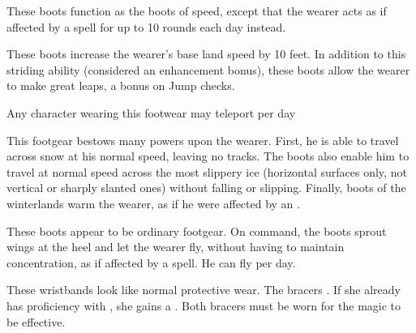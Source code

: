  These boots function as the boots of speed, except that the wearer acts as if affected by a  spell for up to 10 rounds each day instead.

 These boots increase the wearer's base land speed by 10 feet. In addition to this striding ability (considered an enhancement bonus), these boots allow the wearer to make great leaps,  a   bonus on Jump checks.

 Any character wearing this footwear may teleport  per day 

 This footgear bestows many powers upon the wearer. First, he is able to travel across snow at his normal speed, leaving no tracks. The boots also enable him to travel at normal speed across the most slippery ice (horizontal surfaces only, not vertical or sharply slanted ones) without falling or slipping. Finally, boots of the winterlands warm the wearer, as if he were affected by an  .

 These boots appear to be ordinary footgear. On command, the boots sprout wings at the heel and let the wearer fly, without having to maintain concentration, as if affected by a  spell. He can fly  per day.

 These wristbands look like normal protective wear. The bracers . If she already has proficiency with , she gains a  . Both bracers must be worn for the magic to be effective.

